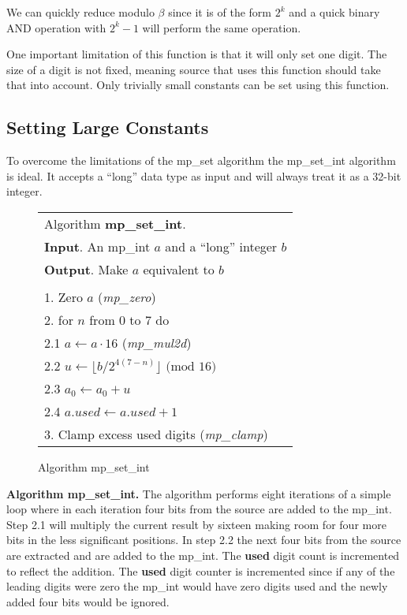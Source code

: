 \documentclass[b5paper]{book}
\begin{document}
We can quickly reduce modulo $\beta$ since it is of the form $2^k$ and a quick binary AND operation with 
$2^k - 1$ will perform the same operation.

One important limitation of this function is that it will only set one digit.  The size of a digit is not fixed, meaning source that uses 
this function should take that into account.  Only trivially small constants can be set using this function.

\subsection{Setting Large Constants}
To overcome the limitations of the mp\_set algorithm the mp\_set\_int algorithm is ideal.  It accepts a ``long''
data type as input and will always treat it as a 32-bit integer.

\begin{figure}[here]
\begin{center}
\begin{tabular}{l}
\hline Algorithm \textbf{mp\_set\_int}. \\
\textbf{Input}.   An mp\_int $a$ and a ``long'' integer $b$ \\
\textbf{Output}.  Make $a$ equivalent to $b$ \\
\hline \\
1.  Zero $a$ (\textit{mp\_zero}) \\
2.  for $n$ from 0 to 7 do \\
\hspace{3mm}2.1  $a \leftarrow a \cdot 16$ (\textit{mp\_mul2d}) \\
\hspace{3mm}2.2  $u \leftarrow \lfloor b / 2^{4(7 - n)} \rfloor \mbox{ (mod }16\mbox{)}$\\
\hspace{3mm}2.3  $a_0 \leftarrow a_0 + u$ \\
\hspace{3mm}2.4  $a.used \leftarrow a.used + 1$ \\
3.  Clamp excess used digits (\textit{mp\_clamp}) \\
\hline
\end{tabular}
\end{center}
\caption{Algorithm mp\_set\_int}
\end{figure}

\textbf{Algorithm mp\_set\_int.}
The algorithm performs eight iterations of a simple loop where in each iteration four bits from the source are added to the 
mp\_int.  Step 2.1 will multiply the current result by sixteen making room for four more bits in the less significant positions.  In step 2.2 the
next four bits from the source are extracted and are added to the mp\_int. The \textbf{used} digit count is 
incremented to reflect the addition.  The \textbf{used} digit counter is incremented since if any of the leading digits were zero the mp\_int would have
zero digits used and the newly added four bits would be ignored.
\end{document}
